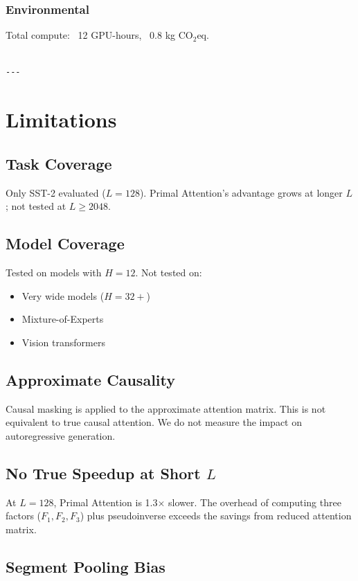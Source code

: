 \subsubsection{Environmental}
Total compute: ~12 GPU-hours, ~0.8 kg CO$_2$eq.
\begin{lstlisting}

---
\end{lstlisting}


\section{Limitations}

\subsection{Task Coverage}

Only SST-2 evaluated ($L = 128$). Primal Attention's advantage grows at 
longer $L$; not tested at $L \ge 2048$.

\subsection{Model Coverage}

Tested on models with $H = 12$. Not tested on:
\begin{itemize}
\item Very wide models ($H = 32+$)
\item Mixture-of-Experts
\item Vision transformers

\end{itemize}
\subsection{Approximate Causality}

Causal masking is applied to the approximate attention matrix. This is 
not equivalent to true causal attention. We do not measure the impact on 
autoregressive generation.

\subsection{No True Speedup at Short $L$}

At $L = 128$, Primal Attention is 1.3$\times$ slower. The overhead of 
computing three factors ($F_1, F_2, F_3$) plus pseudoinverse exceeds the 
savings from reduced attention matrix.

\subsection{Segment Pooling Bias}

